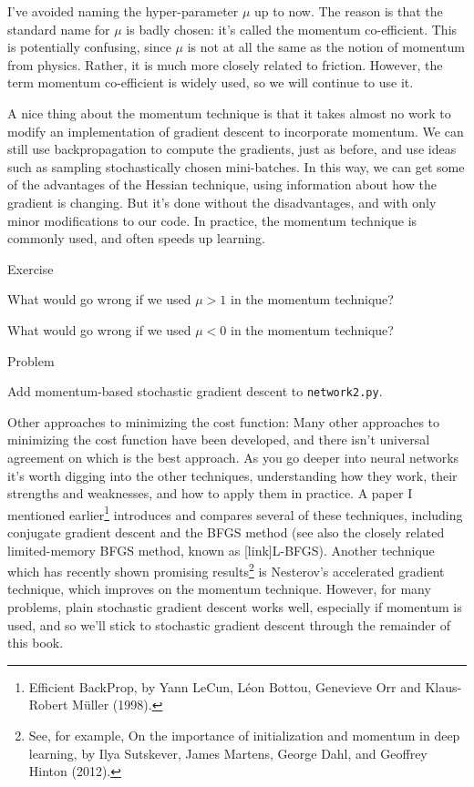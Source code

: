 \documentclass[a4paper,twoside,10pt]{book}
\begin{document}
I've avoided naming the hyper-parameter $\mu$ up to now. The reason is that the standard name for $\mu$ is badly chosen: it's called the momentum co-efficient. This is potentially confusing, since $\mu$ is not at all the same as the notion of momentum from physics. Rather, it is much more closely related to friction. However, the term momentum co-efficient is widely used, so we will continue to use it.

A nice thing about the momentum technique is that it takes almost no work to modify an implementation of gradient descent to incorporate momentum. We can still use backpropagation to compute the gradients, just as before, and use ideas such as sampling stochastically chosen mini-batches. In this way, we can get some of the advantages of the Hessian technique, using information about how the gradient is changing. But it's done without the disadvantages, and with only minor modifications to our code. In practice, the momentum technique is commonly used, and often speeds up learning.
\begin{exercize}{Exercise}
\item What would go wrong if we used $\mu>1$ in the momentum technique?
\item What would go wrong if we used $\mu<0$ in the momentum technique?
\end{exercize}

\begin{exercize}{Problem}
\item Add momentum-based stochastic gradient descent to \texttt{network2.py}.
\end{exercize}
Other approaches to minimizing the cost function: Many other approaches to minimizing the cost function have been developed, and there isn't universal agreement on which is the best approach. As you go deeper into neural networks it's worth digging into the other techniques, understanding how they work, their strengths and weaknesses, and how to apply them in practice. A paper I mentioned earlier\footnote{Efficient BackProp, by Yann LeCun, L\'eon Bottou, Genevieve Orr and Klaus-Robert M\"uller (1998).} introduces and compares several of these techniques, including conjugate gradient descent and the BFGS method (see also the closely related limited-memory BFGS method, known as [link]L-BFGS). Another technique which has recently shown promising results\footnote{See, for example, On the importance of initialization and momentum in deep learning, by Ilya Sutskever, James Martens, George Dahl, and Geoffrey Hinton (2012).} is Nesterov's accelerated gradient technique, which improves on the momentum technique. However, for many problems, plain stochastic gradient descent works well, especially if momentum is used, and so we'll stick to stochastic gradient descent through the remainder of this book.
\end{document}
